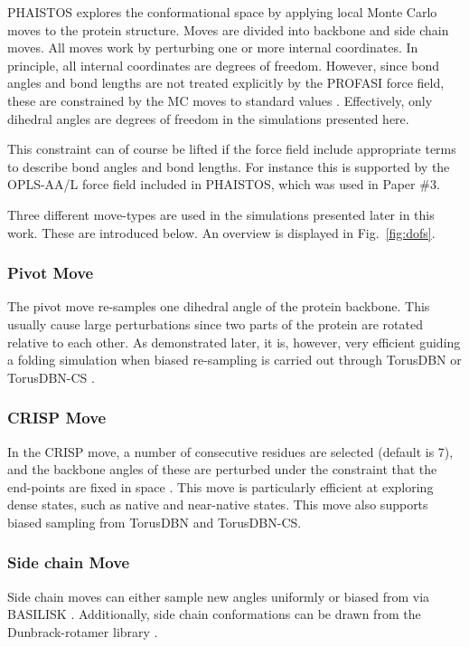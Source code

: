 PHAISTOS explores the conformational space by applying local Monte Carlo moves to the protein structure.
Moves are divided into backbone and side chain moves.
All moves work by perturbing one or more internal coordinates.
In principle, all internal coordinates are degrees of freedom.
However, since bond angles and bond lengths are not treated explicitly by the PROFASI force field, these are constrained by the MC moves to standard values \cite{engh-huber}.
Effectively, only dihedral angles are degrees of freedom in the simulations presented here.

This constraint can of course be lifted if the force field include appropriate terms to describe bond angles and bond lengths.
For instance this is supported by the OPLS-AA/L force field included in PHAISTOS, which was used in Paper \#3.


Three different move-types are used in the simulations presented later in this work.
These are introduced below. An overview is displayed in Fig.~\ref{fig:dofs}.
\subsubsection{Pivot Move}
The pivot move re-samples one dihedral angle of the protein backbone. This usually cause large perturbations since two parts of the protein are rotated relative to each other.
As demonstrated later, it is, however, very efficient guiding a folding simulation when biased re-sampling is carried out through TorusDBN or TorusDBN-CS \cite{Torus08}.

\subsubsection{CRISP Move}
In the CRISP move, a number of consecutive residues are selected (default is 7), and the backbone angles of these are perturbed under the constraint that the end-points are fixed in space \cite{crisp}.
This move is particularly efficient at exploring dense states, such as native and near-native states.
This move also supports biased sampling from TorusDBN and TorusDBN-CS.

\subsubsection{Side chain Move}
Side chain moves can either sample new angles uniformly or biased from via BASILISK \cite{BASILISK}.
Additionally, side chain conformations can be drawn from the Dunbrack-rotamer library \cite{dunbrack}.

